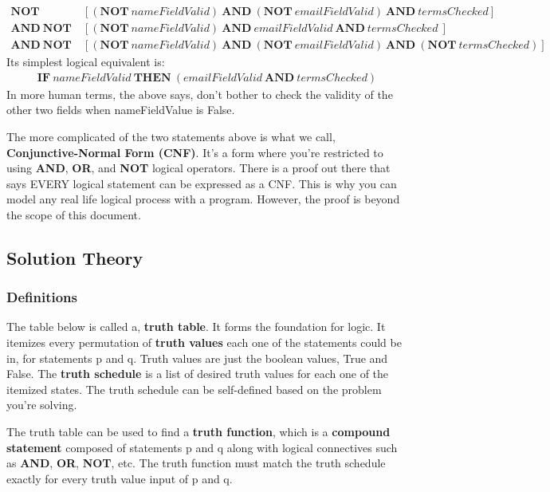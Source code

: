 \documentclass{article}
\begin{document}
\begin{align*}
\textbf{NOT}\:&[(\textbf{NOT}\:nameFieldValid)\:\textbf{AND}\:(\textbf{NOT}\:emailFieldValid)\:\textbf{AND}\:termsChecked]\\
\textbf{AND}\:\textbf{NOT}\:&[(\textbf{NOT}\:nameFieldValid)\:\textbf{AND}\:emailFieldValid\:\textbf{AND}\:termsChecked\:]\\\textbf{AND}\:\textbf{NOT}\:&[(\textbf{NOT}\:nameFieldValid)\:\textbf{AND}\:(\textbf{NOT}\:emailFieldValid)\:\textbf{AND}\:(\textbf{NOT}\:termsChecked)]
\end{align*}
\noindent
Its simplest logical equivalent is:
\begin{align*}
    \textbf{IF}\:nameFieldValid\:\textbf{THEN}\:(emailFieldValid\:\textbf{AND}\:termsChecked)
\end{align*}
\noindent
In more human terms, the above says, don't bother to check the validity of the other two fields when nameFieldValue is False.

The more complicated of the two statements above is what we call, \textbf{Conjunctive-Normal Form (CNF)}. It's a form where you're restricted to using \textbf{AND}, \textbf{OR}, and \textbf{NOT} logical operators. There is a proof out there that says EVERY logical statement can be expressed as a CNF. This is why you can model any real life logical process with a program. However, the proof is beyond the scope of this document. 

\subsection{Solution Theory}
\subsubsection{Definitions}
The table below is called a, \textbf{truth table}. It forms the foundation for logic. It itemizes every permutation of \textbf{truth values} each one of the statements could be in, for statements p and q. Truth values are just the boolean values, True and False. The \textbf{truth schedule} is a list of desired truth values for each one of the itemized states. The truth schedule can be self-defined based on the problem you're solving.

The truth table can be used to find a \textbf{truth function}, which is a \textbf{compound statement} composed of statements p and q along with logical connectives such as \textbf{AND}, \textbf{OR}, \textbf{NOT}, etc. The truth function must match the truth schedule exactly for every truth value input of p and q.
\end{document}

